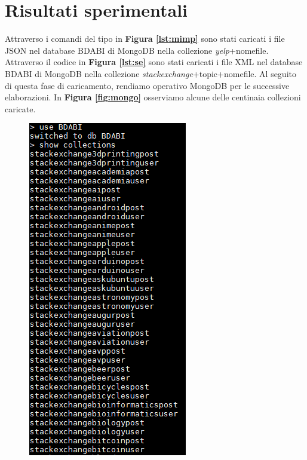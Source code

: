 \chapter{Risultati sperimentali}
Attraverso i comandi del tipo in \textbf{Figura \ref{lst:mimp}} sono stati caricati i file JSON nel database BDABI di MongoDB nella collezione \emph{yelp}+nomefile. Attraverso il codice in \textbf{Figura \ref{lst:se}} sono stati caricati i file XML nel database BDABI di MongoDB nella collezione \emph{stackexchange}+topic+nomefile. Al seguito di questa fase di caricamento, rendiamo operativo MongoDB per le successive elaborazioni. In \textbf{Figura \ref{fig:mongo}} osserviamo alcune delle centinaia collezioni caricate.

\begin{figure}[H]
	\centering
	\includegraphics[scale=0.9]{image/mongo1.PNG}

\end{figure}
